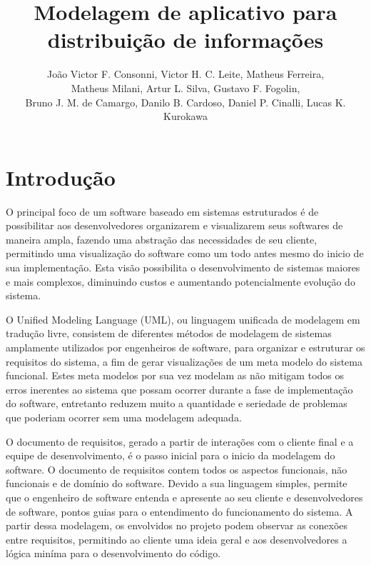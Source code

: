 \documentclass[12pt]{article}
\title{Modelagem de aplicativo para distribuição de informações}
\author{João Victor F. Consonni\inst{1}, Victor H. C. Leite\inst{1}, Matheus Ferreira\inst{1}, \\Matheus Milani\inst{1}, Artur L. Silva\inst{1}, Gustavo F. Fogolin\inst{1}, \\Bruno J. M. de Camargo\inst{1}, Danilo B. Cardoso\inst{1}, Daniel P. Cinalli\inst{1}, Lucas K. Kurokawa\inst{1}}
\begin{document}
 

\maketitle

\begin{abstract} 
  
\end{abstract}

\begin{resumo} 
   
\end{resumo}
\section{Introdução}
O principal foco de um software baseado em sistemas estruturados é de possibilitar aos desenvolvedores organizarem e visualizarem seus softwares de maneira ampla, fazendo uma abstração das necessidades de seu cliente, permitindo uma visualização do software como um todo antes mesmo do inicio de sua implementação. Esta visão possibilita o desenvolvimento de sistemas maiores e mais complexos, diminuindo custos e aumentando potencialmente evolução do sistema.

O Unified Modeling Language (UML), ou linguagem unificada de modelagem em tradução livre, consistem de diferentes métodos de modelagem de sistemas amplamente utilizados por engenheiros de software, para organizar e estruturar os requisitos do sistema, a fim de gerar visualizações de um meta modelo do sistema funcional. Estes meta modelos por sua vez modelam as  não mitigam todos os erros inerentes ao sistema que possam ocorrer durante a fase de implementação do software, entretanto reduzem muito a quantidade e seriedade de problemas que poderiam ocorrer sem uma modelagem adequada.

O documento de requisitos, gerado a partir de interações com o cliente final e a equipe de desenvolvimento, é o passo inicial para o inicio da modelagem do software. O documento de requisitos contem todos os aspectos funcionais, não funcionais e de domínio do software. Devido a sua linguagem simples, permite que o engenheiro de software entenda e apresente ao seu cliente e desenvolvedores de software, pontos guias para o entendimento do funcionamento do sistema. A partir dessa modelagem, os envolvidos no projeto podem observar as conexões entre requisitos, permitindo ao cliente uma ideia geral e aos desenvolvedores a lógica miníma para o desenvolvimento do código.
\end{document}
